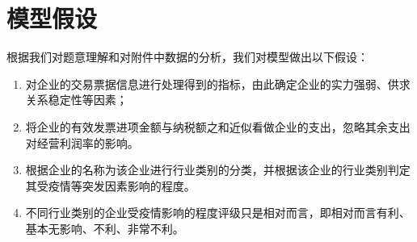 \ifx\allfiles\undefined


\else
\fi


\part{模型假设}

根据我们对题意理解和对附件中数据的分析，我们对模型做出以下假设：

\begin{enumerate}[(1)]
	\item 对企业的交易票据信息进行处理得到的指标，由此确定企业的实力强弱、供求关系稳定性等因素；
	\item 将企业的有效发票进项金额与纳税额之和近似看做企业的支出，忽略其余支出对经营利润率的影响。
	\item 根据企业的名称为该企业进行行业类别的分类，并根据该企业的行业类别判定其受疫情等突发因素影响的程度。
	\item 不同行业类别的企业受疫情影响的程度评级只是相对而言，即相对而言有利、基本无影响、不利、非常不利。
\end{enumerate}


\newpage


\ifx\allfiles\undefined

\fi
